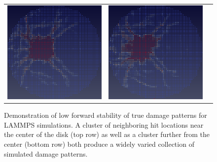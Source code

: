 \begin{figure}
\begin{tabular}{ccc}
  \includegraphics[scale=0.3]{figure/Solutions/solution_2001.eps} &
  \includegraphics[scale=0.3]{figure/Solutions/solution_2002.eps} 
  \end{tabular}
\caption{Demonstration of low forward stability of true damage patterns for LAMMPS simulations.  A cluster of neighboring hit locations near the center of the disk (top row) as well as a cluster further from the center (bottom row) both produce a widely varied collection of simulated damage patterns.}
\label{fig:forward_solutions}       
\end{figure}






